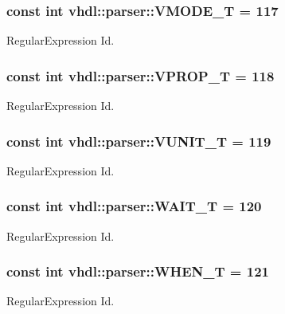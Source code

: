 \subsubsection[{V\+M\+O\+D\+E\+\_\+\+T}]{\setlength{\rightskip}{0pt plus 5cm}const int vhdl\+::parser\+::\+V\+M\+O\+D\+E\+\_\+\+T = 117}\label{namespacevhdl_1_1parser_a3994f768ead2ca3502858fb9cbd34195}
Regular\+Expression Id. \hypertarget{namespacevhdl_1_1parser_a09390cec14979e1a6ee3a634f38f22c4}{}
\subsubsection[{V\+P\+R\+O\+P\+\_\+\+T}]{\setlength{\rightskip}{0pt plus 5cm}const int vhdl\+::parser\+::\+V\+P\+R\+O\+P\+\_\+\+T = 118}\label{namespacevhdl_1_1parser_a09390cec14979e1a6ee3a634f38f22c4}
Regular\+Expression Id. \hypertarget{namespacevhdl_1_1parser_adae31890a08309b75f6eca26c5986ea5}{}
\subsubsection[{V\+U\+N\+I\+T\+\_\+\+T}]{\setlength{\rightskip}{0pt plus 5cm}const int vhdl\+::parser\+::\+V\+U\+N\+I\+T\+\_\+\+T = 119}\label{namespacevhdl_1_1parser_adae31890a08309b75f6eca26c5986ea5}
Regular\+Expression Id. \hypertarget{namespacevhdl_1_1parser_adfad097654c1616aabecf15f38b3e878}{}
\subsubsection[{W\+A\+I\+T\+\_\+\+T}]{\setlength{\rightskip}{0pt plus 5cm}const int vhdl\+::parser\+::\+W\+A\+I\+T\+\_\+\+T = 120}\label{namespacevhdl_1_1parser_adfad097654c1616aabecf15f38b3e878}
Regular\+Expression Id. \hypertarget{namespacevhdl_1_1parser_ad54be7c8f41d8bcd6f35548e1e1ccaa0}{}
\subsubsection[{W\+H\+E\+N\+\_\+\+T}]{\setlength{\rightskip}{0pt plus 5cm}const int vhdl\+::parser\+::\+W\+H\+E\+N\+\_\+\+T = 121}\label{namespacevhdl_1_1parser_ad54be7c8f41d8bcd6f35548e1e1ccaa0}
Regular\+Expression Id. \hypertarget{namespacevhdl_1_1parser_aeb30c03b68b42cb68547d68949e3b4c3}{}
